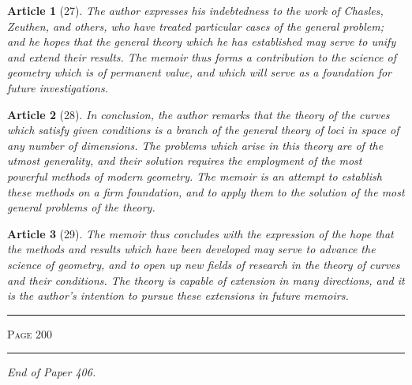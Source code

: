 \documentclass[11pt,a4paper]{article}
\theoremstyle{cayley}
\newtheorem{art}{Article}
\begin{document}
\begin{art}[27]
The author expresses his indebtedness to the work of Chasles, Zeuthen, and others, who have treated particular cases of the general problem; and he hopes that the general theory which he has established may serve to unify and extend their results. The memoir thus forms a contribution to the science of geometry which is of permanent value, and which will serve as a foundation for future investigations.
\end{art}

\begin{art}[28]
In conclusion, the author remarks that the theory of the curves which satisfy given conditions is a branch of the general theory of loci in space of any number of dimensions. The problems which arise in this theory are of the utmost generality, and their solution requires the employment of the most powerful methods of modern geometry. The memoir is an attempt to establish these methods on a firm foundation, and to apply them to the solution of the most general problems of the theory.
\end{art}

\begin{art}[29]
The memoir thus concludes with the expression of the hope that the methods and results which have been developed may serve to advance the science of geometry, and to open up new fields of research in the theory of curves and their conditions. The theory is capable of extension in many directions, and it is the author's intention to pursue these extensions in future memoirs.
\end{art}

\vspace{2em}
\noindent\rule{\textwidth}{0.4pt}
\begin{center}\textsc{Page 200}\end{center}

\vspace{3em}
\begin{center}
\rule{0.5\textwidth}{0.4pt}
\end{center}
\begin{center}
\textit{End of Paper 406.}
\end{center}
\end{document}

